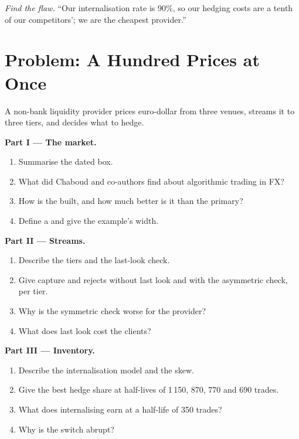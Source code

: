 \begin{exercise}[$\star\star\star$]\label{exo:hf:fx-market-making:8}
\emph{Find the flaw.} ``Our internalisation rate is 90\%, so our hedging costs are a tenth of our competitors'; we are the cheapest provider.''
\end{exercise}

\section{Problem: A Hundred Prices at Once}

\begin{problem}\label{pb:hf:fx-market-making:1}
A non-bank liquidity provider prices euro-dollar from three venues, streams it to three tiers, and decides what to hedge.

\medskip\noindent\textbf{Part I --- The market.}
\begin{enumerate}
\item Summarise the dated box.
\item What did Chaboud and co-authors find about algorithmic trading in FX?
\item How is the  built, and how much better is it than the primary?
\item Define a  and give the example's width.
\end{enumerate}

\medskip\noindent\textbf{Part II --- Streams.}
\begin{enumerate}[resume]
\item Describe the tiers and the last-look check.
\item Give capture and rejects without last look and with the asymmetric check, per tier.
\item Why is the symmetric check worse for the provider?
\item What does last look cost the clients?
\end{enumerate}

\medskip\noindent\textbf{Part III --- Inventory.}
\begin{enumerate}[resume]
\item Describe the internalisation model and the skew.
\item Give the best hedge share at half-lives of 1\,150, 870, 770 and 690 trades.
\item What does internalising earn at a half-life of 350 trades?
\item Why is the switch abrupt?
\end{enumerate}


\end{problem}

